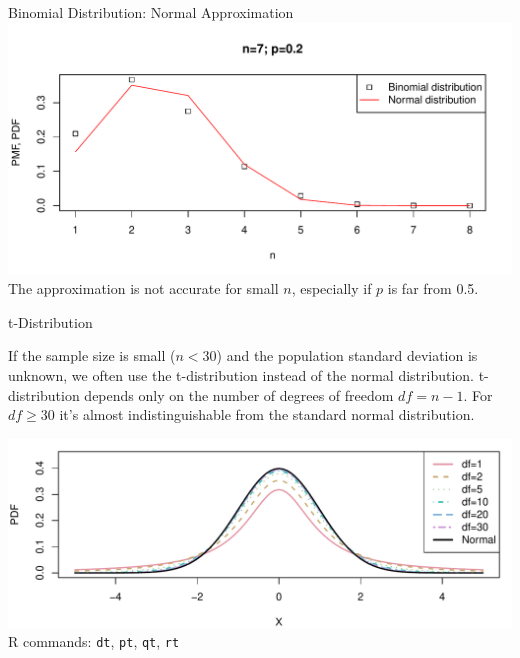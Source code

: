\begin{frame}{Binomial Distribution: Normal Approximation}
    \includegraphics[width=\linewidth]{R/plots/norm_approx_to_binom_2}
    The approximation is not accurate for small $n$, especially if $p$ is far from 0.5.
\end{frame}

\begin{frame}{t-Distribution}

    If the sample size is small ($n < 30$) and the population standard deviation is unknown, we often use the t-distribution instead of the normal distribution. t-distribution depends only on the number of degrees of freedom $df = n - 1$. For $df \ge 30$ it's almost indistinguishable from the standard normal distribution.
    
    \includegraphics[width=\linewidth]{R/plots/t_distribution}
    {\tiny R commands: \texttt{dt}, \texttt{pt}, \texttt{qt}, \texttt{rt}}

\end{frame}

